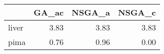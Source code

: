 \begin{tabular}{lrrr}
\toprule
{} &  GA\_ac &  NSGA\_a &  NSGA\_c \\
\midrule
liver &   3.83 &    3.83 &    3.83 \\
pima  &   0.76 &    0.96 &    0.00 \\
\bottomrule
\end{tabular}
